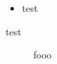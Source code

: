 \documentclass{minimal}
\begin{document}
\begin{itemize}
  \item test
    \begin{description}
    \end{description}
\end{itemize}

\begin{description}
  \item[test] fooo
    \begin{itemize}
    \end{itemize}
\end{description}
\end{document}
